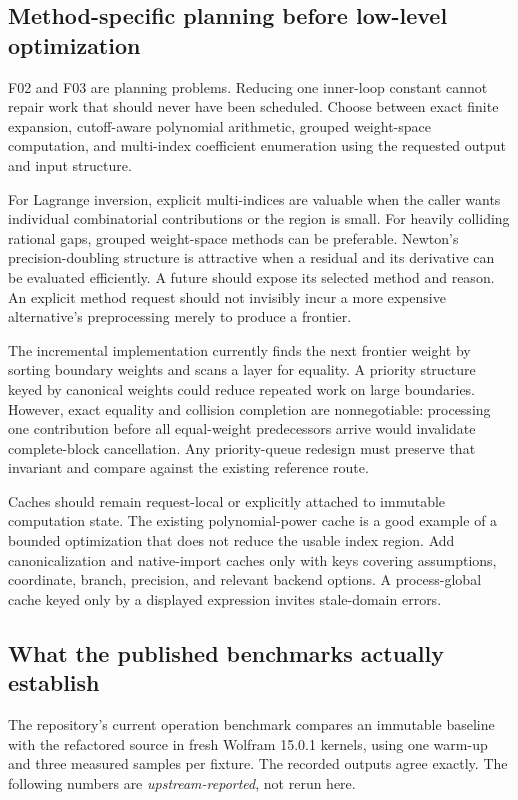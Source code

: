 \documentclass[11pt,a4paper]{article}
\newcommand{\code}[1]{\texttt{\detokenize{#1}}}
\begin{document}
\subsection{Method-specific planning before low-level optimization}

F02 and F03 are planning problems. Reducing one inner-loop constant cannot repair work that should never have been scheduled. Choose between exact finite expansion, cutoff-aware polynomial arithmetic, grouped weight-space computation, and multi-index coefficient enumeration using the requested output and input structure.

For Lagrange inversion, explicit multi-indices are valuable when the caller wants individual combinatorial contributions or the region is small. For heavily colliding rational gaps, grouped weight-space methods can be preferable. Newton's precision-doubling structure is attractive when a residual and its derivative can be evaluated efficiently. A future \code{Method -> Automatic} should expose its selected method and reason. An explicit method request should not invisibly incur a more expensive alternative's preprocessing merely to produce a frontier.

The incremental implementation currently finds the next frontier weight by sorting boundary weights and scans a layer for equality. A priority structure keyed by canonical weights could reduce repeated work on large boundaries. However, exact equality and collision completion are nonnegotiable: processing one contribution before all equal-weight predecessors arrive would invalidate complete-block cancellation. Any priority-queue redesign must preserve that invariant and compare against the existing reference route.\cite{incremental}

Caches should remain request-local or explicitly attached to immutable computation state. The existing polynomial-power cache is a good example of a bounded optimization that does not reduce the usable index region. Add canonicalization and native-import caches only with keys covering assumptions, coordinate, branch, precision, and relevant backend options. A process-global cache keyed only by a displayed expression invites stale-domain errors.\cite{incremental,native}

\subsection{What the published benchmarks actually establish}

The repository's current operation benchmark compares an immutable baseline with the refactored source in fresh Wolfram 15.0.1 kernels, using one warm-up and three measured samples per fixture. The recorded outputs agree exactly. The following numbers are \emph{upstream-reported}, not rerun here.\cite{validation}
\end{document}
